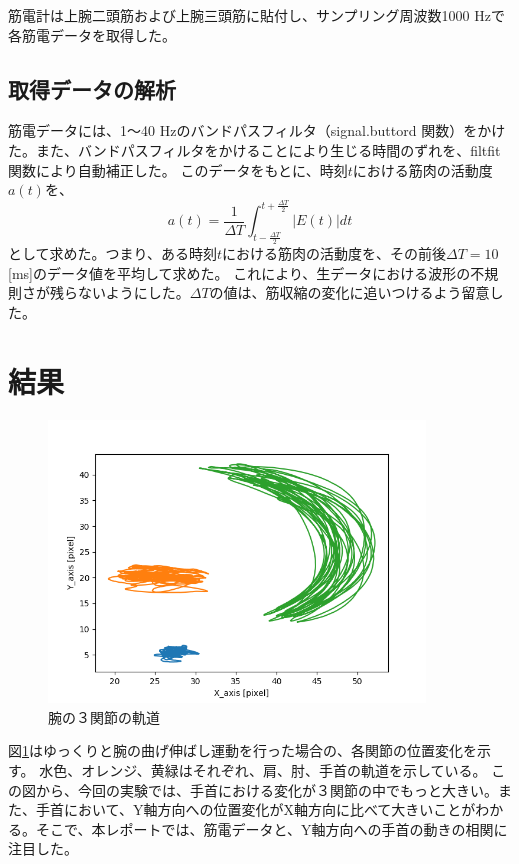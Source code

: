\documentclass{jsarticle}
\begin{document}
筋電計は上腕二頭筋および上腕三頭筋に貼付し、サンプリング周波数1000 Hzで各筋電データを取得した。

\subsection{取得データの解析}
筋電データには、1〜40 Hzのバンドパスフィルタ（signal.buttord 関数）をかけた。また、バンドパスフィルタをかけることにより生じる時間のずれを、filtfit 関数により自動補正した。
このデータをもとに、時刻$t$における筋肉の活動度$a(t)$を、
$$a(t) = \frac{1}{\Delta T} \int_{t-\frac{\Delta T}{2}}^{t+\frac{\Delta T}{2}} |E(t)|dt $$
として求めた。つまり、ある時刻$t$における筋肉の活動度を、その前後$\Delta T = 10$ [ms]のデータ値を平均して求めた。
これにより、生データにおける波形の不規則さが残らないようにした。$\Delta T$の値は、筋収縮の変化に追いつけるよう留意した。

\clearpage
\section{結果}

\begin{figure}[h]
	\begin{center} %
		\includegraphics[width=10cm]{graph_image/slow_kidou.png}
		\caption{腕の３関節の軌道} %
		\label{fig:kidou} %
	\end{center}
\end{figure}
図\ref{fig:kidou}はゆっくりと腕の曲げ伸ばし運動を行った場合の、各関節の位置変化を示す。
水色、オレンジ、黄緑はそれぞれ、肩、肘、手首の軌道を示している。
この図から、今回の実験では、手首における変化が３関節の中でもっと大きい。また、手首において、Y軸方向への位置変化がX軸方向に比べて大きいことがわかる。そこで、本レポートでは、筋電データと、Y軸方向への手首の動きの相関に注目した。
\end{document}
